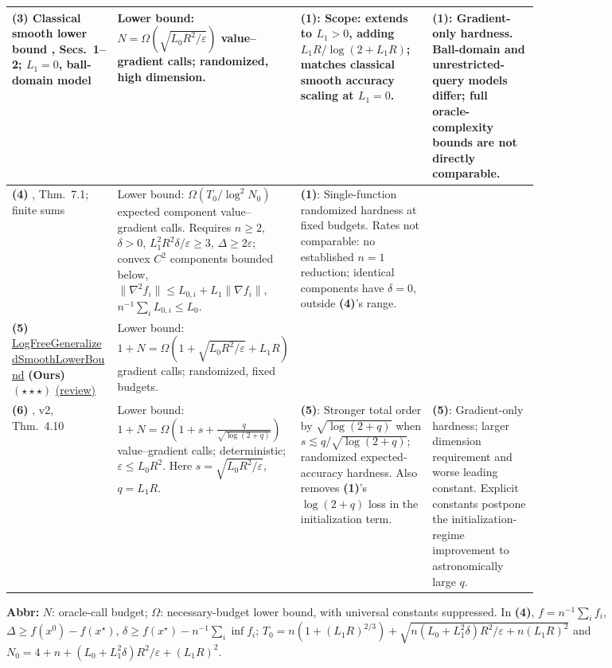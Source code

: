 \begin{table}[tp]
\begin{threeparttable}
\begin{tabularx}{\linewidth}{@{}>{\raggedright\arraybackslash}p{0.20\linewidth}>{\raggedright\arraybackslash}p{0.32\linewidth}>{\raggedright\arraybackslash}p{0.25\linewidth}>{\raggedright\arraybackslash}X@{}}
\midrule
\textbf{(3)} Classical smooth lower bound \citep{gscFullGarg2021}, Secs.~1--2; $L_1=0$, ball-domain model & Lower bound: $N=\Omega\!\left(\sqrt{L_0R^2/\varepsilon}\right)$ value--gradient calls; randomized, high dimension. & \textbf{(1)}: Scope: extends to $L_1>0$, adding $L_1R/\log(2+L_1R)$; matches classical smooth accuracy scaling at $L_1=0$. & \textbf{(1)}: Gradient-only hardness. Ball-domain and unrestricted-query models differ; full oracle-complexity bounds are not directly comparable. \\
\midrule
\textbf{(4)} \citep{gscFullEverestIIv1}, Thm.~7.1; finite sums & Lower bound: $\Omega(T_0/\log^2N_0)$ expected component value--gradient calls. Requires $n\ge2$, $\delta>0$, $L_1^2R^2\delta/\varepsilon\ge3$, $\Delta\ge2\varepsilon$; convex $C^2$ components bounded below, $\|\nabla^2 f_i\|\le L_{0,i}+L_1\|\nabla f_i\|$, $n^{-1}\sum_iL_{0,i}\le L_0$. & \textbf{(1)}: Single-function randomized hardness at fixed budgets. Rates not comparable: no established $n=1$ reduction; identical components have $\delta=0$, outside \textbf{(4)}'s range. & \\
\midrule
\textbf{(5)} \href{https://github.com/k3nfalt/longtails/blob/main/LongTails/Theorems/LogFreeGeneralizedSmoothLowerBound.lean}{Log\allowbreak Free\allowbreak Generalized\allowbreak Smooth\allowbreak Lower\allowbreak Bound} \textbf{(Ours)} $(\star\star\star)$ \href{https://github.com/k3nfalt/longtails/blob/main/scripts/reviews/LogFreeGeneralizedSmoothLowerBound.md}{(review)} & Lower bound: $1+N=\Omega\!\left(1+\sqrt{L_0R^2/\varepsilon}+L_1R\right)$ gradient calls; randomized, fixed budgets. & & \\
\midrule[1.2pt]
\textbf{(6)} \citep{mirrorEverestV2}, v2, Thm.~4.10 & Lower bound: $1+N=\Omega\!\left(1+s+\frac{q}{\sqrt{\log(2+q)}}\right)$ value--gradient calls; deterministic; $\varepsilon\le L_0R^2$. Here $s=\sqrt{L_0R^2/\varepsilon}$, $q=L_1R$. & \textbf{(5)}: Stronger total order by $\sqrt{\log(2+q)}$ when $s\lesssim q/\sqrt{\log(2+q)}$; randomized expected-accuracy hardness. Also removes \textbf{(1)}'s $\log(2+q)$ loss in the initialization term. & \textbf{(5)}: Gradient-only hardness; larger dimension requirement and worse leading constant. Explicit constants postpone the initialization-regime improvement to astronomically large $q$. \\
\bottomrule
\end{tabularx}
\begin{tablenotes}[flushleft]\footnotesize
\item[] \textbf{Abbr:} $N$: oracle-call budget; $\Omega$: necessary-budget lower bound, with universal constants suppressed. In \textbf{(4)}, $f=n^{-1}\sum_i f_i$, $\Delta\ge f(x^0)-f(x^\star)$, $\delta\ge f(x^\star)-n^{-1}\sum_i\inf f_i$; $T_0=n(1+(L_1R)^{2/3})+\sqrt{n(L_0+L_1^2\delta)R^2/\varepsilon+n(L_1R)^2}$ and $N_0=4+n+(L_0+L_1^2\delta)R^2/\varepsilon+(L_1R)^2$.
\end{tablenotes}
\end{threeparttable}
\end{table}
\clearpage
